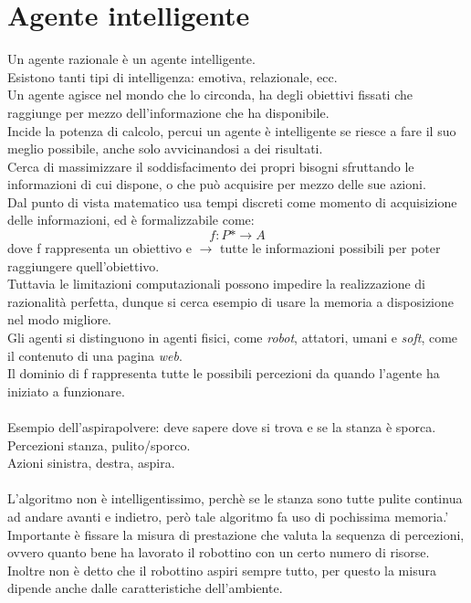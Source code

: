 \documentclass[10pt,a4paper]{book}
\begin{document}
\section{Agente intelligente}
Un agente razionale \`e un agente intelligente.\\
Esistono tanti tipi di intelligenza: emotiva, relazionale, ecc.\\
Un agente agisce nel mondo che lo circonda, ha degli obiettivi fissati che raggiunge per mezzo dell'informazione che ha disponibile.\\
Incide la potenza di calcolo, percui un agente \`e intelligente se riesce a fare il suo meglio possibile, anche solo avvicinandosi a dei risultati.\\
Cerca di massimizzare il soddisfacimento dei propri bisogni sfruttando le informazioni di cui dispone, o che pu\`o acquisire per mezzo delle sue azioni.\\
Dal punto di vista matematico usa tempi discreti come momento di acquisizione delle informazioni, ed \`e  formalizzabile come:
\begin{equation}
f:\textit{P*} \longrightarrow \textit{A}
\end{equation}
dove f rappresenta un obiettivo e $\longrightarrow$ tutte le informazioni possibili per poter raggiungere quell'obiettivo.\\
Tuttavia le limitazioni computazionali possono impedire la realizzazione di razionalit\`a perfetta, dunque si cerca esempio di usare la memoria a disposizione nel modo migliore.\\
Gli agenti si distinguono in agenti fisici, come \textit{robot}, attatori, umani e \textit{soft}, come il contenuto di una pagina \textit{web}.\\
Il dominio di f rappresenta tutte le possibili percezioni da quando l'agente ha iniziato a funzionare.
\\\\
Esempio dell'aspirapolvere: deve sapere dove si trova e se la stanza \`e sporca.\\
Percezioni stanza, pulito/sporco.\\
Azioni sinistra, destra, aspira.\\
\\
L'algoritmo non \`e intelligentissimo, perch\`e se le stanza sono tutte pulite continua ad andare avanti e indietro, per\`o tale algoritmo fa uso di pochissima memoria.'\\
Importante \`e fissare la misura di prestazione che valuta la sequenza di percezioni, ovvero quanto bene ha lavorato il robottino con un certo numero di risorse. Inoltre non \`e detto che il robottino aspiri sempre tutto, per questo la misura dipende anche dalle caratteristiche dell'ambiente.
\end{document}
